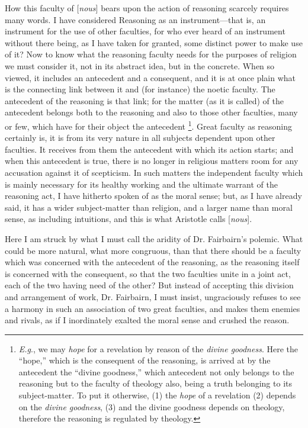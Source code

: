 How this faculty of [\emph{nous}] bears upon the
action of reasoning scarcely requires many words. I have considered
Reasoning as an instrument—that is, an instrument for the use of
other faculties, for who ever heard of an instrument without there
being, as I have taken for granted, some distinct power to make use of
it? Now to know what the reasoning faculty needs for the purposes of
religion we must consider it, not in its abstract idea, but in the
concrete. When so viewed, it includes an antecedent and a
consequent, and it is at once plain what is the connecting link
between it and (for instance) the noetic faculty. The antecedent of
the reasoning is that link; for the matter (as it is called) of the
antecedent belongs both to the reasoning and also to those other
faculties, many or few, which have for their object the antecedent \footnote{\emph{E.g}., we may \emph{hope} for a revelation by reason of the \emph{divine
goodness}. Here the ``hope,'' which is the consequent of the
reasoning, is arrived at by the antecedent the ``divine goodness,''
which antecedent not only belongs to the reasoning but to the faculty
of theology also, being a truth belonging to its subject-matter. To
put it otherwise, (1) the \emph{hope} of a revelation (2) depends on
the \emph{divine goodness}, (3) and the divine goodness depends on
theology, therefore the reasoning is regulated by theology.}. Great faculty as reasoning certainly is, it is from its very
nature in all subjects dependent upon other faculties. It receives
from them the antecedent with which its action starts; and when this
antecedent is true, there is no longer in religious matters room for
any accusation against it of scepticism. In such matters the
independent faculty which is mainly necessary for its healthy working
and the ultimate warrant of the reasoning act, I have hitherto spoken
of as the moral sense; but, as I have already said, it has a wider
subject-matter than religion, and a larger name than moral sense, as
including intuitions, and this is what Aristotle calls [\emph{nous}].

Here I am struck by what I must call the aridity
of Dr. Fairbairn's polemic. What could be more natural, what more
congruous, than that there should be a faculty which was concerned
with the antecedent of the reasoning, as the reasoning itself is
concerned with the consequent, so that the two faculties unite in a
joint act, each of the two having need of the other? But instead of
accepting this division and arrangement of work, Dr. Fairbairn, I must
insist, ungraciously refuses to see a harmony in such an association
of two great faculties, and makes them enemies and rivals, as if I
inordinately exalted the moral sense and crushed the reason.

